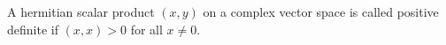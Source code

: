 A hermitian scalar product $(x, y)$ on a complex vector space is called positive definite if $(x, x) > 0$ for all $x \neq 0$.
